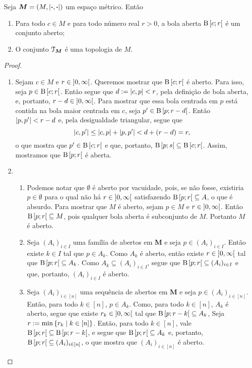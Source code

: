 \begin{proposition}
Seja $\bm M = (M,\left\vert{\bm{\cdot}},{\bm{\cdot}}\right\vert)$ um espaço métrico. Então
	\begin{enumerate}
	\item Para todo $c \in M$ e para todo número real $r > 0$, a bola aberta $\mathrm{B}\left[{c};{r}\right[$ é um conjunto aberto;
	\item O conjunto $\mathcal{T}_{\bm M}$ é uma topologia de $M$.
	\end{enumerate}
\end{proposition}
\begin{proof}
	\begin{enumerate}
	\item Sejam $c \in M$ e $r \in \left]{0},{\infty}\right[$. Queremos mostrar que $\mathrm{B}\left[{c};{r}\right[$ é aberto. Para isso, seja $p \in \mathrm{B}\left[{c};{r}\right[$. Então segue que $d := \left\vert{c},{p}\right\vert < r$, pela definição de bola aberta, e, portanto, $r-d \in \left]{0},{\infty}\right[$. Para mostrar que essa bola centrada em $p$ está contida na bola maior centrada em $c$, seja $p' \in \mathrm{B}\left[{p};{r-d}\right[$. Então $\left\vert{p},{p'}\right\vert<r-d$ e, pela desigualdade triangular, segue que
	\begin{equation*}
	\left\vert{c},{p'}\right\vert \leq \left\vert{c},{p}\right\vert + \left\vert{p},{p'}\right\vert < d + (r-d) = r,
	\end{equation*}
o que mostra que $p' \in \mathrm{B}\left[{c};{r}\right[$ e que, portanto, $\mathrm{B}\left[{p};{s}\right[ \subseteq \mathrm{B}\left[{c};{r}\right[$. Assim, mostramos que $\mathrm{B}\left[{p};{r}\right[$ é aberta.

	\item
		\begin{enumerate}
		\item Podemos notar que $\emptyset$ é aberto por vacuidade, pois, se não fosse, existiria $p \in \emptyset$ para o qual não há $r \in \left]{0},{\infty}\right[$ satisfazendo $\mathrm{B}\left[{p};{r}\right[ \subseteq A$, o que é absurdo.
	Para mostrar que $M$ é aberto, sejam $p \in M$ e $r \in \left]{0},{\infty}\right[$. Então $\mathrm{B}\left[{p};{r}\right[ \subseteq M$, pois qualquer bola aberta é subconjunto de $M$. Portanto $M$ é aberto.

		\item Seja $(A_i)_{i \in I}$ uma família de abertos em $\bm M$ e seja $p \in (A_i)_{i \in I}$. Então existe $k \in I$ tal que $p \in A_k$. Como $A_k$ é aberto, então existe $r \in \left]{0},{\infty}\right[$ tal que $\mathrm{B}\left[{p};{r}\right[ \subseteq A_k$. Como $A_k \subseteq (A_i)_{i \in I}$, segue que $\mathrm{B}\left[{p};{r}\right[ \subseteq (A_i)_{i \in I}$ e que, portanto, $(A_i)_{i \in I}$ é aberto.

		\item Seja $(A_i)_{i \in [n]}$ uma sequência de abertos em $\bm M$ e seja $p \in (A_i)_{i \in [n]}$. Então, para todo $k \in [n]$, $p \in A_k$. Como, para todo $k \in [n]$, $A_k$ é aberto, segue que existe $r_k \in \left]{0},{\infty}\right[$ tal que $\mathrm{B}\left[{p};{r-k}\right[ \subseteq A_k$, Seja $r := \min \left\{{r_k}\;\middle\vert\;{k \in [n]}\right\}$. Então, para todo $k \in [n]$, vale $\mathrm{B}\left[{p};{r}\right[ \subseteq \mathrm{B}\left[{p};{r-k}\right[$, e segue que $\mathrm{B}\left[{p};{r}\right[ \subseteq A_k$ e, portanto, $\mathrm{B}\left[{p};{r}\right[ \subseteq (A_i)_{i \in [n]}$, o que mostra que $(A_i)_{i \in [n]}$ é aberto.
		\end{enumerate}
	\end{enumerate}
\end{proof}

